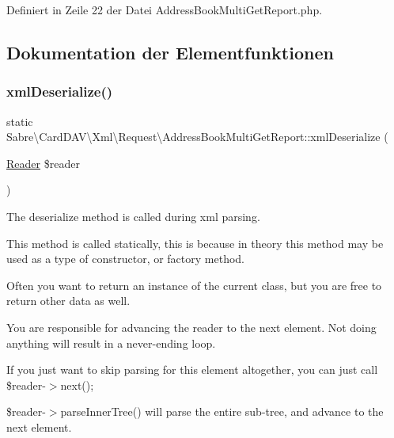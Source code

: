 Definiert in Zeile 22 der Datei Address\+Book\+Multi\+Get\+Report.\+php.



\subsection{Dokumentation der Elementfunktionen}
\mbox{\label{class_sabre_1_1_card_d_a_v_1_1_xml_1_1_request_1_1_address_book_multi_get_report_a7d63d7736ac0c6fe905d9db5a1192d92}} 
\subsubsection{\texorpdfstring{xml\+Deserialize()}{xmlDeserialize()}}
{\footnotesize\ttfamily static Sabre\textbackslash{}\+Card\+D\+A\+V\textbackslash{}\+Xml\textbackslash{}\+Request\textbackslash{}\+Address\+Book\+Multi\+Get\+Report\+::xml\+Deserialize (\begin{DoxyParamCaption}\item[{\mbox{\hyperlink{class_sabre_1_1_xml_1_1_reader}{Reader}}}]{\$reader }\end{DoxyParamCaption})\hspace{0.3cm}{\ttfamily [static]}}

The deserialize method is called during xml parsing.

This method is called statically, this is because in theory this method may be used as a type of constructor, or factory method.

Often you want to return an instance of the current class, but you are free to return other data as well.

You are responsible for advancing the reader to the next element. Not doing anything will result in a never-\/ending loop.

If you just want to skip parsing for this element altogether, you can just call \$reader-\/$>$next();

\$reader-\/$>$parse\+Inner\+Tree() will parse the entire sub-\/tree, and advance to the next element.


